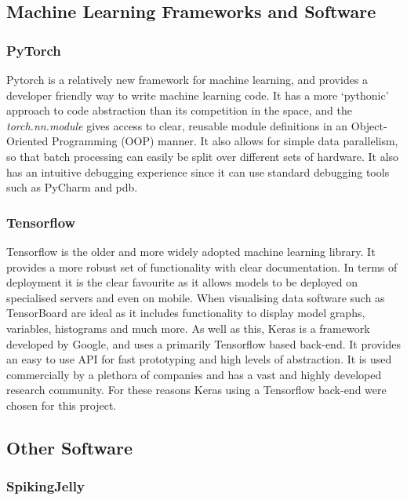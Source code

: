 \subsection{Machine Learning Frameworks and Software}

\subsubsection{PyTorch}

Pytorch\cite{Pytorch} is a relatively new framework for machine learning, and provides a developer friendly way to write machine learning code. It has a more `pythonic' approach to code abstraction than its competition in the space, and the \emph{torch.nn.module} gives access to clear, reusable module definitions in an Object-Oriented Programming (OOP) manner. It also allows for simple data parallelism, so that batch processing can easily be split over different sets of hardware. It also has an intuitive debugging experience since it can use standard debugging tools such as PyCharm and pdb.

\subsubsection{Tensorflow}

Tensorflow\cite{Tensorflow} is the older and more widely adopted machine learning library. It provides a more robust set of functionality with clear documentation. In terms of deployment it is the clear favourite as it allows models to be deployed on specialised servers and even on mobile. When visualising data software such as TensorBoard are ideal as it includes functionality to display model graphs, variables, histograms and much more. As well as this, Keras\cite{Keras} is a framework developed by Google, and uses a primarily Tensorflow based back-end. It provides an easy to use API for fast prototyping and high levels of abstraction. It is used commercially by a plethora of companies and has a vast and highly developed research community. For these reasons Keras using a Tensorflow back-end were chosen for this project.

\subsection{Other Software}

\subsubsection{SpikingJelly}

